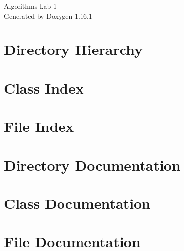 \documentclass[twoside]{book}
\newcommand{\+}{\discretionary{\mbox{\scriptsize$\hookleftarrow$}}{}{}}
\newcommand{\clearemptydoublepage}{%
    \newpage{\pagestyle{empty}\cleardoublepage}%
  }
\begin{document}
  \raggedbottom
    \hypersetup{pageanchor=false,
                bookmarksnumbered=true,
                pdfencoding=unicode
               }
  \begin{titlepage}
  \vspace*{7cm}
  \begin{center}%
  {\Large Algorithms Lab 1}\\
  \vspace*{1cm}
  {\large Generated by Doxygen 1.16.1}\\
  \end{center}
  \end{titlepage}
  \clearemptydoublepage
  \tableofcontents
  \clearemptydoublepage
  \hypersetup{pageanchor=true}
\chapter{Directory Hierarchy}

\chapter{Class Index}

\chapter{File Index}

\chapter{Directory Documentation}

\chapter{Class Documentation}

\chapter{File Documentation}







  \backmatter
  \newpage
  \clearemptydoublepage
  \printindex
\end{document}
